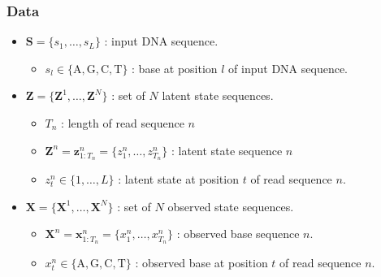 \documentclass[10pt]{article}
\begin{document}
\subsubsection{Data}
\begin{itemize}
\item $\mathbf{S} = \{s_1,\ldots,s_L\}$ : input DNA sequence.
\begin{itemize}
\item $s_l \in \{\mathrm{A,G,C,T}\}$ : base at position $l$ of input DNA sequence.
\end{itemize}
\item $\mathbf{Z} =\{\mathbf{Z}^1,\ldots,\mathbf{Z}^N\}$ : set of $N$ latent state sequences.
\begin{itemize}
\item $T_n$ : length of read sequence $n$
\item $\mathbf{Z}^n = \mathbf{z}^n_{1:T_n} = \{z^n_1,\ldots,z^n_{T_n}\}$ : latent state sequence $n$
\item $z_t^n \in \{1,\ldots,L\}$ : latent state at position $t$ of read sequence $n$.
\end{itemize}
\item $\mathbf{X} = \{\mathbf{X}^1,\ldots,\mathbf{X}^N\}$ : set of $N$ observed state sequences.
\begin{itemize}
\item $\mathbf{X}^n = \mathbf{x}_{1:T_n}^n = \{x_1^n,\ldots,x_{T_n}^n\}$ : observed base sequence $n$.
\item $x_t^n \in \{\mathrm{A,G,C,T}\}$ : observed base at position $t$ of read sequence $n$.
\end{itemize}
\end{itemize}
\end{document}

